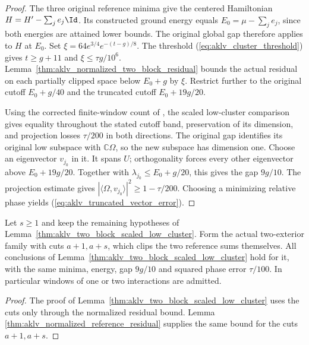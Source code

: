 \begin{proof}
    \leanok
    The three original reference minima give the centered Hamiltonian
    $H=H'-\sum_j e_j\Id$. Its constructed ground energy equals
    $E_0=\mu-\sum_j e_j$, since both energies are attained lower bounds.
    The original global gap therefore applies to $H$ at $E_0$.
    Set $\xi=64e^{3/4}e^{-(t-g)/8}$.
    The threshold (\ref{eq:aklv_cluster_threshold}) gives
    $t\ge g+11$ and $\xi\le\tau g/10^6$.
    Lemma~\ref{thm:aklv_normalized_two_block_residual} bounds the actual
    residual on each partially clipped space below $E_0+g$ by $\xi$.
    Restrict further to the original cutoff $E_0+g/40$ and the truncated
    cutoff $E_0+19g/20$.

    Using the corrected finite-window count of
    \cite{gap:alvv16_hard_truncation_windows}, the scaled low-cluster comparison
    gives equality throughout the stated
    cutoff band, preservation of its dimension, and projection losses
    $\tau/200$ in both directions. The original gap identifies its original
    low subspace with $\mathbb C\Omega$, so the new subspace has dimension one.
    Choose an eigenvector $v_{j_0}$ in it. It spans $U$; orthogonality forces
    every other eigenvector above $E_0+19g/20$. Together with
    $\lambda_{j_0}\le E_0+g/20$, this gives the gap $9g/10$.
    The projection estimate gives
    $|\langle\Omega,v_{j_0}\rangle|^2\ge1-\tau/200$.
    Choosing a minimizing relative phase yields
    (\ref{eq:aklv_truncated_vector_error}).
\end{proof}

\begin{lemma}
    \label{thm:aklv_reference_scaled_low_cluster}
    \leanok
    Let $s\ge1$ and keep the remaining hypotheses of
    Lemma~\ref{thm:aklv_two_block_scaled_low_cluster}. Form the actual
    two-exterior family with cuts $a+1,a+s$, which clips the two reference
    sums themselves. All conclusions of
    Lemma~\ref{thm:aklv_two_block_scaled_low_cluster} hold for it, with the
    same minima, energy, gap $9g/10$ and squared phase error $\tau/100$.
    In particular windows of one or two interactions are admitted.
\end{lemma}
\begin{proof}
    \leanok
    The proof of Lemma~\ref{thm:aklv_two_block_scaled_low_cluster} uses the
    cuts only through the normalized residual bound. Lemma
    \ref{thm:aklv_normalized_reference_residual} supplies the same bound
    for the cuts $a+1,a+s$.
\end{proof}

